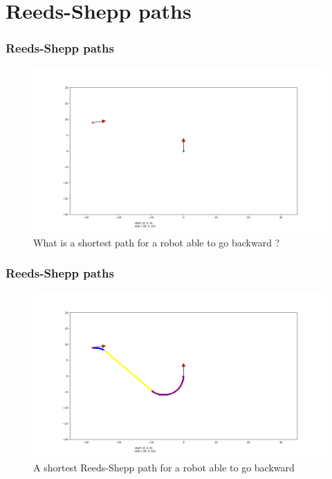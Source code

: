\documentclass{beamer}
\begin{document}
\section{Reeds-Shepp paths}

\begin{frame}

\frametitle{Reeds-Shepp paths}

\begin{figure}
\centering
  \centering
  \includegraphics[width=1.1\linewidth]{Illustrations/humanOriented.png}
  \caption{What is a shortest path for a robot able to go backward ?}
  \label{fig:sub1}
\end{figure}
\end{frame}

\begin{frame}

\frametitle{Reeds-Shepp paths}

\begin{figure}
\centering
  \centering
  \includegraphics[width=1.1\linewidth]{Illustrations/ReedsSheppBeautiful.png}
  \caption{A shortest Reeds-Shepp path for a robot able to go backward}
  \label{fig:sub1}
\end{figure}
\end{frame}
\end{document}
